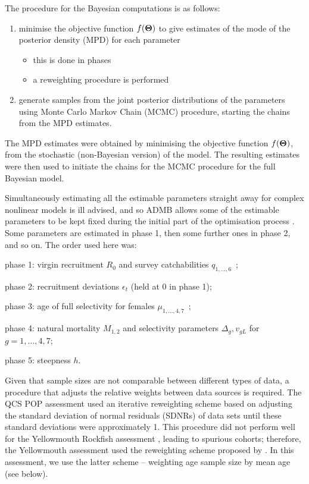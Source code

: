 \documentclass[11pt]{article}   %
\def\gcomm{7}                    %
\def\bfTh{{\bf \Theta}}          %
\def\headc{\vspace{-1ex}} %
\def\subsub#1{\noindent {\bf #1} \headc}    %
\newcommand{\popQCS}{Edwards-etal:2012pop}
\newcommand{\ymr}{Edwards-etal:2012ymr}
\begin{document}
The procedure for the Bayesian computations is as follows:
\begin{enumerate}
\item minimise the objective function $f(\bfTh)$ to give estimates of the mode of the posterior density (MPD) for each parameter

\begin{itemize}

\item this is done in phases  %
   
\item a reweighting procedure is performed 

\end{itemize}

\item generate samples from the joint posterior distributions of the parameters using Monte Carlo Markov Chain (MCMC) procedure, starting the chains from the MPD estimates.
\end{enumerate}


\subsub{Phases}

The MPD estimates were obtained by minimising the objective function $f(\bfTh)$, from the stochastic (non-Bayesian version) of the model. The resulting estimates were then used to initiate the chains for the MCMC procedure for the full Bayesian model.

Simultaneously estimating all the estimable parameters straight away for complex nonlinear models is ill advised, and so ADMB allows some of the estimable parameters to be kept fixed during the initial part of the optimisation process \citet{ADMB2009}. Some parameters are estimated in phase 1, then some further ones in phase 2, and so on. The order used here was:

phase 1: virgin recruitment $R_0$ and survey catchabilities $q_{1,...,6}$~;

phase 2: recruitment deviations $\epsilon_t$ (held at 0 in phase 1);

phase 3: age of full selectivity for females $\mu_{1,...,4,\gcomm}$~;

phase 4: natural mortality $M_{1,2}$ and selectivity parameters $\Delta_g, v_{gL}$ for $g = 1,...,4,7$;

phase 5: steepness $h$.

\subsub{Reweighting}

Given that sample sizes are not comparable between different types of data, a procedure that adjusts the relative weights between data sources is required. The QCS POP assessment \citep{\popQCS} used an iterative reweighting scheme based on adjusting the standard deviation of normal residuals (SDNRs) of data sets until these standard deviations were approximately 1. This procedure did not perform well for the Yellowmouth Rockfish assessment \citep{\ymr}, leading to spurious cohorts; therefore, the Yellowmouth assessment used the reweighting scheme proposed by \citet{fran11}. In this assessment, we use the latter scheme -- weighting age sample size by mean age (see below).
\end{document}
